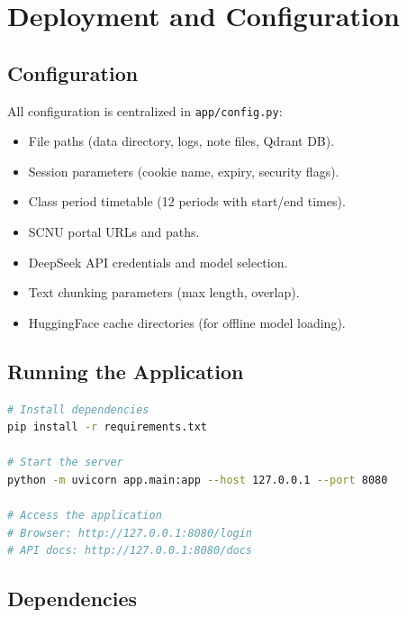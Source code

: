 \documentclass[12pt,a4paper]{article}
\begin{document}
\section{Deployment and Configuration}
\label{sec:deploy}

\subsection{Configuration}

All configuration is centralized in \texttt{app/config.py}:
\begin{itemize}[nosep]
    \item File paths (data directory, logs, note files, Qdrant DB).
    \item Session parameters (cookie name, expiry, security flags).
    \item Class period timetable (12 periods with start/end times).
    \item SCNU portal URLs and paths.
    \item DeepSeek API credentials and model selection.
    \item Text chunking parameters (max length, overlap).
    \item HuggingFace cache directories (for offline model loading).
\end{itemize}

\subsection{Running the Application}

\begin{lstlisting}[language=bash]
# Install dependencies
pip install -r requirements.txt

# Start the server
python -m uvicorn app.main:app --host 127.0.0.1 --port 8080

# Access the application
# Browser: http://127.0.0.1:8080/login
# API docs: http://127.0.0.1:8080/docs
\end{lstlisting}

\subsection{Dependencies}
\end{document}
